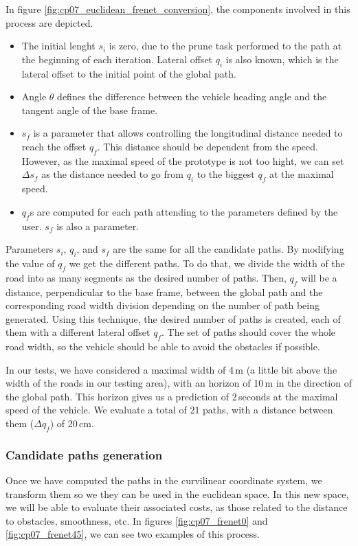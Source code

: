 In figure \ref{fig:cp07_euclidean_frenet_conversion}, the components involved in this process are depicted.
\begin{itemize}
 \item The initial lenght $s_i$ is zero, due to the prune task performed to the path at the beginning of each iteration. Lateral offset $q_i$ is also known, which is the lateral offset to the initial point of the global path.
 \item Angle $\theta$ defines the difference between the vehicle heading angle and the tangent angle of the base frame.
 \item $s_f$ is a parameter that allows controlling the longitudinal distance needed to reach the offset $q_f$. This distance should be dependent from the speed. However, as the maximal speed of the prototype is not too hight, we can set $\Delta s_f$ as the distance needed to go from $q_i$ to the biggest $q_f$ at the maximal speed.
 \item $q_f$s are computed for each path attending to the parameters defined by the user. $s_f$ is also a parameter.
\end{itemize}

Parameters $s_i$, $q_i$, and $s_f$ are the same for all the candidate paths. By modifying the value of $q_f$ we get the different paths. To do that, we divide the width of the road into as many segments as the desired number of paths. Then, $q_f$ will be a distance, perpendicular to the base frame, between the global path and the corresponding road width division depending on the number of path being generated. Using this technique, the desired number of paths is created, each of them with a different lateral offset $q_f$. The set of paths should cover the whole road width, so the vehicle should be able to avoid the obstacles if possible.

In our tests, we have considered a maximal width of 4\,m (a little bit above the width of the roads in our testing area), with an horizon of 10\,m in the direction of the global path. This horizon gives us a prediction of 2\,seconds at the maximal speed of the vehicle. We evaluate a total of 21 paths, with a distance between them ($\Delta q_f$) of 20\,cm.

\subsubsection{Candidate paths generation}\label{ch:chapter07_01_03_02}

Once we have computed the paths in the curvilinear coordinate system, we transform them so we they can be used in the euclidean space. In this new space, we will be able to evaluate their associated costs, as those related to the distance to obstacles, smoothness, etc. In figures \ref{fig:cp07_frenet0} and \ref{fig:cp07_frenet45}, we can see two examples of this process.

